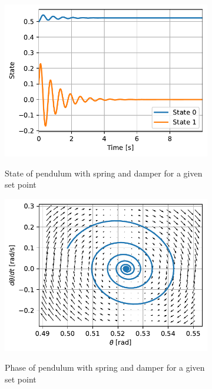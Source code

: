 \documentclass{cmc}
\begin{document}
\begin{figure}[H]
  \centering
  \begin{subfigure}[b]{0.49\textwidth}
    { \centering
      \includegraphics[width=\textwidth]{figures/State_Pendulum_Fixed_Position_(x0_=_[0dot5,_0dot1]).pdf}
    }
    \caption{State of pendulum with spring and damper for a given set
      point}
    \label{fig:state-pendulum-spring-damper-position}
  \end{subfigure}
  \begin{subfigure}[b]{0.49\textwidth}
    { \centering
      \includegraphics[width=\textwidth]{figures/Phase_Pendulum_Fixed_Position_(x0_=_[0dot5,_0dot1]).pdf}
    }
    \caption{Phase of pendulum with spring and damper for a given set
      point}
    \label{fig:phase-pendulum-spring-damper-position}
  \end{subfigure}
  \caption{}
  \label{fig:pendulum-spring-damper-position}
\end{figure}
\end{document}
